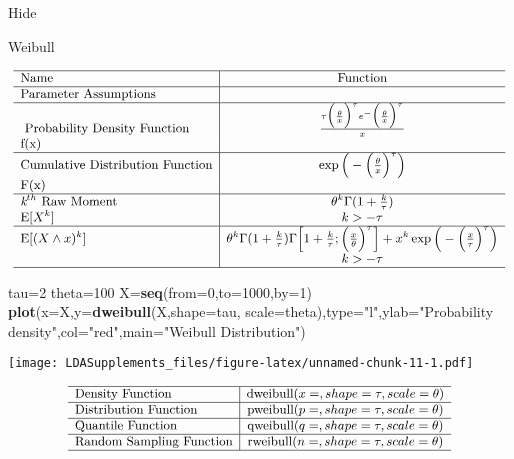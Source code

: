 \documentclass[]{book}
\newenvironment{Shaded}{\begin{snugshade}}{\end{snugshade}}
\newcommand{\KeywordTok}[1]{\textcolor[rgb]{0.13,0.29,0.53}{\textbf{#1}}}
\newcommand{\DataTypeTok}[1]{\textcolor[rgb]{0.13,0.29,0.53}{#1}}
\newcommand{\DecValTok}[1]{\textcolor[rgb]{0.00,0.00,0.81}{#1}}
\newcommand{\StringTok}[1]{\textcolor[rgb]{0.31,0.60,0.02}{#1}}
\newcommand{\NormalTok}[1]{#1}
\begin{document}
\hypertarget{2pG}{}
{Hide}

Weibull

\[
{\small
\begin{matrix}
\begin{array}{l|c}
\hline
  \text{Name} & \text{Function} \\
\hline
  \text{Parameter Assumptions} &  \\
\hline\
  \text{Probability Density Function} & \frac{\tau \Big(\frac{\theta}{x}\Big)^\tau e^-\Big(\frac{\theta}{x}\Big)^\tau}{x} \\
    \text{f(x)} & \\
\hline
  \text{Cumulative Distribution Function} & \exp\Big(-\Big(\frac{\theta}{x}\Big)^\tau\Big) \\
    \text{F(x)} & \\
\hline
  \textit{k}^{th}~\text{Raw Moment} & \theta^k \Gamma(1 + \frac{k}{\tau}) \\
  \mathrm{E}[X^k]  & k>-\tau \\
\hline
  \mathrm{E}[(X\wedge x)^k] & \theta^k\Gamma(1+\frac{k}{\tau})\Gamma\Big[1+\frac{k}{\tau};\Big(\frac{x}{\theta}\Big)^\tau\Big]+x^k\exp\Big(-\Big(\frac{x}{\tau}\Big)^\tau\Big)  \\
   & k>-\tau \\
\hline
\end{array}
\end{matrix}
}
\]

\begin{Shaded}
\begin{Highlighting}[]
\NormalTok{tau=}\DecValTok{2}
\NormalTok{theta=}\DecValTok{100}
\NormalTok{X=}\KeywordTok{seq}\NormalTok{(}\DataTypeTok{from=}\DecValTok{0}\NormalTok{,}\DataTypeTok{to=}\DecValTok{1000}\NormalTok{,}\DataTypeTok{by=}\DecValTok{1}\NormalTok{)}
\KeywordTok{plot}\NormalTok{(}\DataTypeTok{x=}\NormalTok{X,}\DataTypeTok{y=}\KeywordTok{dweibull}\NormalTok{(X,}\DataTypeTok{shape=}\NormalTok{tau, }\DataTypeTok{scale=}\NormalTok{theta),}\DataTypeTok{type=}\StringTok{"l"}\NormalTok{,}\DataTypeTok{ylab=}\StringTok{"Probability density"}\NormalTok{,}\DataTypeTok{col=}\StringTok{"red"}\NormalTok{,}\DataTypeTok{main=}\StringTok{"Weibull Distribution"}\NormalTok{)}
\end{Highlighting}
\end{Shaded}

\texttt{[image: LDASupplements\_files/figure-latex/unnamed-chunk-11-1.pdf]}

\[
{\small
\begin{matrix}
\begin{array}{l|c}
\hline
  \text{Density Function} & \text{dweibull}(x=, shape=\tau, scale=\theta) \\
\hline
  \text{Distribution Function} & \text{pweibull}(p=, shape=\tau,scale=\theta) \\
\hline
  \text{Quantile Function} & \text{qweibull}(q=, shape=\tau,scale=\theta) \\ 
\hline
  \text{Random Sampling Function} & \text{rweibull}(n=, shape=\tau,scale=\theta) \\
\hline
\end{array}
\end{matrix}
}
\]
\end{document}
